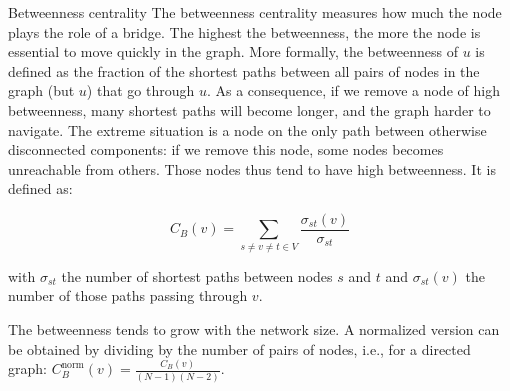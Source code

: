 \documentclass[a4paper,11pt]{book}
\begin{document}
\begin{textbox}{Betweenness centrality}
The betweenness centrality measures how much the node plays the role of a bridge. The highest the betweenness, the more the node is essential to move quickly in the graph. More formally, the betweenness of $u$ is defined as the fraction of the shortest paths between all pairs of nodes in the graph (but $u$) that go through $u$. As a consequence, if we remove a node of high betweenness, many shortest paths will become longer, and the graph harder to navigate. The extreme situation is a node on the only path between otherwise disconnected components: if we remove this node, some nodes becomes unreachable from others. Those nodes thus tend to have high betweenness. It is defined as:

\[ C_{B}(v)=\sum _{s\neq v\neq t\in V}{\frac {\sigma _{st}(v)}{\sigma _{st}}}\]

with $\sigma _{st}$ the number of shortest paths between nodes $s$ and $t$ and $\sigma _{st}(v)$ the number of those paths passing through $v$.


The betweenness tends to grow with the network size. A normalized version can be obtained by dividing by the number of pairs of nodes, i.e., for a directed graph: $C_{B}^{\text{norm}}(v)=\frac{C_{B}(v)}{(N-1)(N-2)}$.

\end{textbox}
\end{document}
